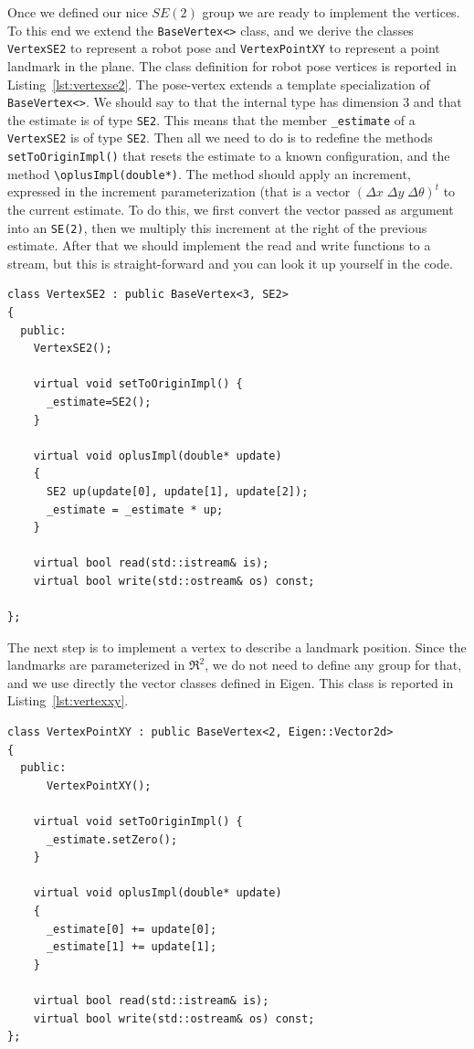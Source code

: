 \documentclass[a4paper]{article}
\begin{document}
Once we defined our nice $SE(2)$ group we are ready to implement the
vertices.  To this end we extend the \verb+BaseVertex<>+ class, and we
derive the classes \verb+VertexSE2+ to represent a robot pose and
\verb+VertexPointXY+ to represent a point landmark in the plane.
The class definition for robot pose vertices is reported in
Listing~\ref{lst:vertexse2}.
The pose-vertex extends a template specialization of
\verb+BaseVertex<>+.  We should say to \gopt{} that the internal type
has dimension 3 and that the estimate is of type \verb+SE2+. This
means that the member \verb+_estimate+ of a \verb+VertexSE2+ is of
type \verb+SE2+.  Then all we need to do is to redefine the methods
\verb+setToOriginImpl()+ that resets the estimate to a known
configuration, and the method \verb+\oplusImpl(double*)+.  The method
should apply an increment, expressed in the increment parameterization
(that is a vector $(\Delta x \; \Delta y \; \Delta \theta )^t$ to the
current estimate.  To do this, we first convert the vector passed as
argument into an \verb+SE(2)+, then we multiply this increment at the
right of the previous estimate.  After that we should implement the
read and write functions to a stream, but this is straight-forward and
you can look it up yourself in the code.

\begin{lstlisting}[float,label=lst:vertexse2,caption=Vertex representing
  a 2D robot pose]
class VertexSE2 : public BaseVertex<3, SE2>
{
  public:
    VertexSE2();

    virtual void setToOriginImpl() {
      _estimate=SE2();
    }

    virtual void oplusImpl(double* update)
    {
      SE2 up(update[0], update[1], update[2]);
      _estimate = _estimate * up;
    }

    virtual bool read(std::istream& is);
    virtual bool write(std::ostream& os) const;

};
\end{lstlisting}
The next step is to implement a vertex to describe a landmark
position.  Since the landmarks are parameterized in $\Re^2$, we do not
need to define any group for that, and we use directly the vector
classes defined in Eigen. This class is reported in Listing~\ref{lst:vertexxy}.

\begin{lstlisting}[float,label=lst:vertexxy,caption=Vertex representing
  a 2D landmark]
class VertexPointXY : public BaseVertex<2, Eigen::Vector2d>
{
  public:
      VertexPointXY();

    virtual void setToOriginImpl() {
      _estimate.setZero();
    }

    virtual void oplusImpl(double* update)
    {
      _estimate[0] += update[0];
      _estimate[1] += update[1];
    }

    virtual bool read(std::istream& is);
    virtual bool write(std::ostream& os) const;
};
\end{lstlisting}
\end{document}
